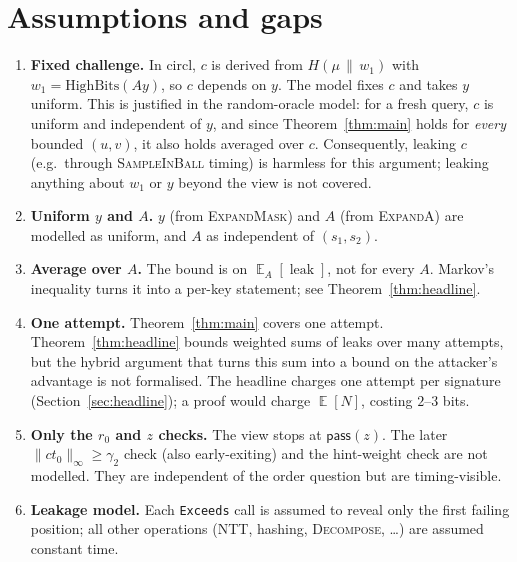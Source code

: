\documentclass[11pt]{article}
\theoremstyle{definition}
\theoremstyle{remark}
\newcommand{\E}{\mathop{\mathbb{E}}}
\newcommand{\leak}{\operatorname{leak}}
\begin{document}
\section{Assumptions and gaps}\label{sec:assumptions}

\begin{enumerate}\renewcommand{\labelenumi}{\textbf{A\arabic{enumi}.}}
\item \textbf{Fixed challenge.} In circl, $c$ is derived from $H(\mu\,\|\,w_1)$ with
  $w_1 = \mathrm{HighBits}(Ay)$, so $c$ depends on $y$. The model fixes $c$ and takes $y$ uniform.
  This is justified in the random-oracle model: for a fresh query, $c$ is uniform and independent
  of $y$, and since Theorem~\ref{thm:main} holds for \emph{every} bounded $(u,v)$, it also holds
  averaged over $c$. Consequently, leaking $c$ (e.g.\ through \textsc{SampleInBall} timing) is
  harmless for this argument; leaking anything about $w_1$ or $y$ beyond the view is not covered.
\item \textbf{Uniform $y$ and $A$.} $y$ (from \textsc{ExpandMask}) and $A$ (from \textsc{ExpandA}) are
  modelled as uniform, and $A$ as independent of $(s_1,s_2)$.
\item \textbf{Average over $A$.} The bound is on $\E_A[\leak]$, not for every $A$. Markov's
  inequality turns it into a per-key statement; see Theorem~\ref{thm:headline}.
\item \textbf{One attempt.} Theorem~\ref{thm:main} covers one attempt. Theorem~\ref{thm:headline}
  bounds weighted sums of leaks over many attempts, but the hybrid argument that turns this sum
  into a bound on the attacker's advantage is not formalised. The headline charges one attempt
  per signature (Section~\ref{sec:headline}); a proof would charge $\E[N]$, costing $2$--$3$
  bits.
\item \textbf{Only the $r_0$ and $z$ checks.} The view stops at $\mathsf{pass}(z)$. The
  later $\|ct_0\|_\infty\ge\gamma_2$ check (also early-exiting) and the hint-weight check are not
  modelled. They are independent of the order question but are timing-visible.
\item \textbf{Leakage model.} Each \texttt{Exceeds} call is assumed to reveal only the first
  failing position; all other operations (NTT, hashing, \textsc{Decompose}, \ldots) are assumed
  constant time.
\end{enumerate}
\end{document}
